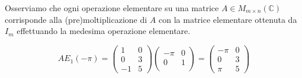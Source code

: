 \documentclass[a4paper]{article}
\theoremstyle{break}
\theoremstyle{break}
\theoremstyle{break}
\theoremstyle{break}
\begin{document}
\noindent Osserviamo che ogni operazione elementare su una matrice \( A \in M_{m \times n} (\mathbb{C}) \)
corrisponde alla (pre)moltiplicazione di \( A \) con la matrice elementare ottenuta da
\( I_m \) effettuando la medesima operazione elementare.
\begin{figure}[H]
  \begin{define}
    \[
      AE_1(-\pi ) = \begin{pmatrix} 
        1 & 0\\
        0 & 3\\
        -1 & 5
      \end{pmatrix}
      \begin{pmatrix} 
        -\pi & 0\\
        0 & 1\\
      \end{pmatrix} 
      =
      \begin{pmatrix} 
        -\pi & 0\\
        0 & 3\\
        \pi & 5
      \end{pmatrix}
    \] 
  \end{define}
\end{figure}
\end{document}

